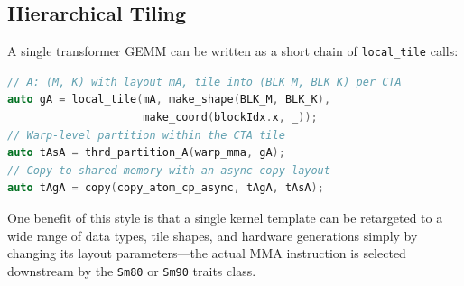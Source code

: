 \subsection{Hierarchical Tiling}\label{sec:cute_tiling}
A single transformer GEMM can be written as a short chain of
\texttt{local\_tile} calls:
\begin{lstlisting}[language=C++,basicstyle=\ttfamily\scriptsize]
// A: (M, K) with layout mA, tile into (BLK_M, BLK_K) per CTA
auto gA = local_tile(mA, make_shape(BLK_M, BLK_K),
                     make_coord(blockIdx.x, _));
// Warp-level partition within the CTA tile
auto tAsA = thrd_partition_A(warp_mma, gA);
// Copy to shared memory with an async-copy layout
auto tAgA = copy(copy_atom_cp_async, tAgA, tAsA);
\end{lstlisting}
One benefit of this style is that a single kernel template can be
retargeted to a wide range of data types, tile shapes, and hardware
generations simply by changing its layout parameters---the actual
MMA instruction is selected downstream by the \texttt{Sm80} or
\texttt{Sm90} traits class.

